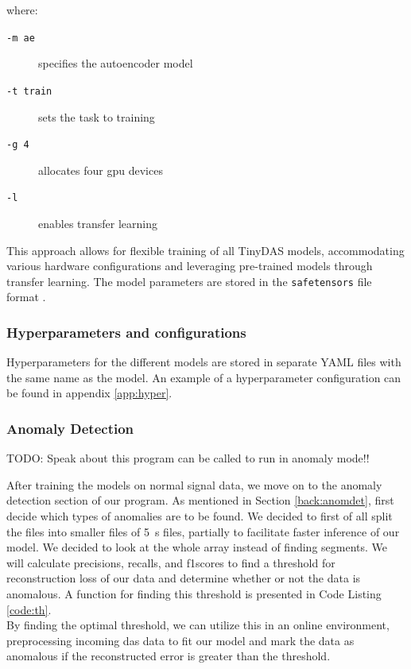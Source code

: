 where:
\begin{description}
\item[\texttt{-m ae}] specifies the autoencoder model
\item[\texttt{-t train}] sets the task to training
\item[\texttt{-g 4}] allocates four \acrshort{gpu} devices
\item[\texttt{-l}] enables transfer learning
\end{description}

This approach allows for flexible training of all TinyDAS models, accommodating various hardware configurations and leveraging pre-trained models through transfer learning. The model parameters are stored in the \texttt{safetensors} file format \cite{safetensors}.

\subsubsection{Hyperparameters and configurations}

Hyperparameters for the different models are stored in separate YAML files with the same name as the model. An example of a hyperparameter configuration can be found in appendix \ref{app:hyper}.


\subsubsection{Anomaly Detection}

TODO: Speak about this program can be called to run in anomaly mode!!

 
After training the models on normal signal data, we move on to the anomaly detection section of our program. As mentioned in Section \ref{back:anomdet}, first decide which types of anomalies are to be found. We decided to first of all split the files into smaller files of \qty{5}{\si{\second}} files, partially to facilitate faster inference of our model. We decided to look at the whole array instead of finding segments. We will calculate precisions, recalls, and f1scores to find a threshold for reconstruction loss of our data and determine whether or not the data is anomalous. A function for finding this threshold is presented in Code Listing \ref{code:th}.  \\



By finding the optimal threshold, we can utilize this in an online environment, preprocessing incoming \acrshort{das} data to fit our model and mark the data as anomalous if the reconstructed error is greater than the threshold. 


